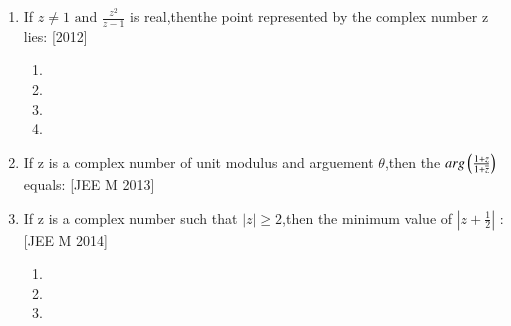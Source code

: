 \documentclass[journal,12pt,twocolumn,article]{IEEEtran}
\theoremstyle{remark}
\begin{document}
\begin{enumerate}[start = 14]
\item If $z \neq 1 \text{ and } \frac{z^2}{z-1}$ is real,thenthe point represented by the complex number z lies:
\hfill{[2012]}

\begin{enumerate}

\item {}
                                   
                              
\item {}
                             
\item {}                                                              
\item {}
                                   
\end{enumerate}

\item If z is a complex number of unit modulus and arguement $\theta$,then the $arg\left(\frac{1+z}{1+\overline{z}}\right)$ equals:
\hfill{[JEE M 2013]}

\begin{enumerate}
\end{enumerate}

\item If z is a complex number such that $|z|\geq 2$,then the minimum value of $|z+\frac{1}{2}|$ :     
\hfill{[JEE M 2014]}  

\begin{enumerate}
                             
\item {}      

\item {} 
\item {} 


\end{enumerate}
\end{enumerate}
\end{document}
